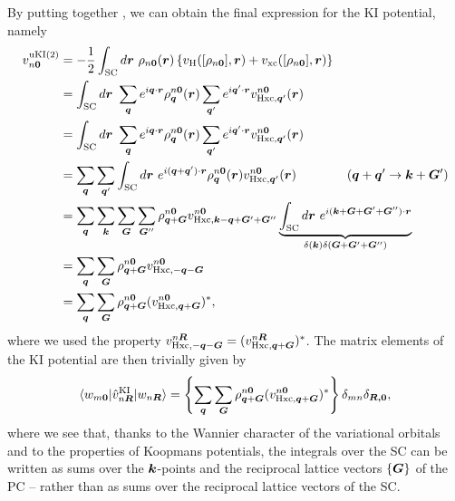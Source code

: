 By putting together , we can obtain the final expression for the KI potential, namely
%
\begin{equation}
    \begin{split}
        v^{\rm uKI(2)}_{n{\bm 0}} &= - \frac{1}{2} \int_{\rm SC} d{\bm r} \ \rho_{n{\bm 0}}({\bm r}) \left\{ v_{\rm H}([\rho_{n{\bm 0}}],{\bm r}) + v_{\rm xc}([\rho_{n{\bm 0}}],{\bm r}) \right\} \\
        &= \int_{\rm SC} d{\bm r} \ \sum_{{\bm q}} e^{i {\bm q} \cdot {\bm r}} \rho_{{\bm q}}^{n {\bm 0}}({\bm r}) \sum_{{\bm q}'} e^{i {\bm q}' \cdot {\bm r}} v_{{\rm Hxc},{\bm q}'}^{n{\bm 0}}({\bm r}) \\
        &= \int_{\rm SC} d{\bm r} \ \sum_{{\bm q}} e^{i {\bm q} \cdot {\bm r}} \rho_{{\bm q}}^{n {\bm 0}}({\bm r}) \sum_
        {{\bm q}'} e^{i {\bm q}' \cdot {\bm r}} v_{{\rm Hxc},{\bm q}'}^{n{\bm 0}}({\bm r}) \\
        &= \sum_{{\bm q}} \sum_{{\bm q}'} \int_{\rm SC} d{\bm r} \ e^{i ({\bm q}+{\bm q}') \cdot {\bm r}} \rho_{{\bm q}}^{n {\bm 0}}({\bm r}) v_{{\rm Hxc},{\bm q}'}^{n{\bm 0}}({\bm r}) \qquad \qquad ({\bm q} + {\bm q}' \rightarrow {\bm k} + {\bm G}') \\
        &= \sum_{{\bm q}} \sum_{{\bm k}} \sum_{{\bm G}} \sum_{{\bm G}''} \rho_{{\bm q}+{\bm G}}^{n {\bm 0}} v_{{\rm Hxc},{\bm k} - {\bm q} + {\bm G}' + {\bm G}''}^{n{\bm 0}} \underbrace{\int_{\rm SC} d{\bm r} \ e^{i ({\bm k} + {\bm G} + {\bm G}' + {\bm G}'') \cdot {\bm r}}}_{\delta({\bm k})\delta({\bm G}+{\bm G}'+{\bm G}'')} \\
        &= \sum_{{\bm q}} \sum_{{\bm G}} \rho_{{\bm q}+{\bm G}}^{n {\bm 0}} v_{{\rm Hxc},-{\bm q}-{\bm G}}^{n{\bm 0}} \\
        &= \sum_{{\bm q}} \sum_{{\bm G}} \rho_{{\bm q}+{\bm G}}^{n {\bm 0}} (v_{{\rm Hxc},{\bm q}+{\bm G}}^{n{\bm 0}})^* ,
    \end{split}
    \label{eq:ki-pot-second-order-kcw}
\end{equation}
%
where we used the property $v_{{\rm Hxc},-{\bm q}-{\bm G}}^{n {\bm R}} = (v_{{\rm Hxc},{\bm q}+{\bm G}}^{n {\bm R}})^*$. The matrix elements of the KI potential are then trivially given by
%
\begin{equation}
    \braket{w_{m{\bm 0}}|\hat{v}^{\rm KI}_{n{\bm R}}|w_{n{\bm R}}} = \left\{ \sum_{{\bm q}} \sum_{{\bm G}} \rho_{{\bm q}+{\bm G}}^{n {\bm 0}} (v_{{\rm Hxc},{\bm q}+{\bm G}}^{n{\bm 0}})^* \right\} \delta_{mn} \delta_{\bm{R,0}} ,
    \label{eq:matrix-elements-ki-pot-kcw}
\end{equation}
%
where we see that, thanks to the Wannier character of the variational orbitals and to the properties of Koopmans potentials, the integrals over the SC can be written as sums over the ${\bm k}$-points and the reciprocal lattice vectors $\{ {\bm G} \}$ of the PC -- rather than as sums over the reciprocal lattice vectors of the SC.

